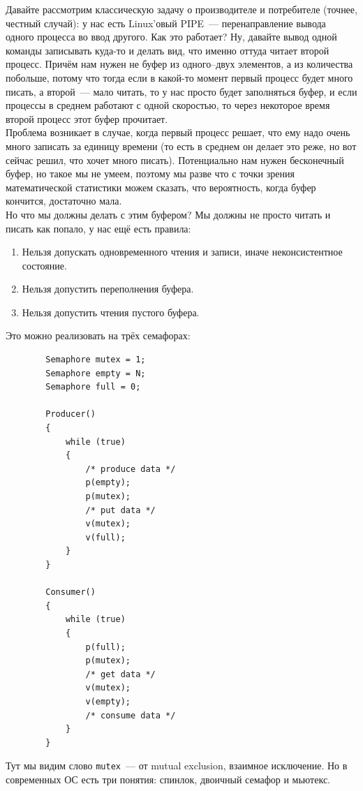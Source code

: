 \documentclass{article}
\begin{document}
    Давайте рассмотрим классическую задачу о производителе и потребителе (точнее, честный случай): у нас есть Linux'овый PIPE~--- перенаправление вывода одного процесса во ввод другого. Как это работает? Ну, давайте вывод одной команды записывать куда-то и делать вид, что именно оттуда читает второй процесс. Причём нам нужен не буфер из одного--двух элементов, а из количества побольше, потому что тогда если в какой-то момент первый процесс будет много писать, а второй~--- мало читать, то у нас просто будет заполняться буфер, и если процессы в среднем работают с одной скоростью, то через некоторое время второй процесс этот буфер прочитает.\\
    Проблема возникает в случае, когда первый процесс решает, что ему надо очень много записать за единицу времени (то есть в среднем он делает это реже, но вот сейчас решил, что хочет много писать). Потенциально нам нужен бесконечный буфер, но такое мы не умеем, поэтому мы разве что с точки зрения математической статистики можем сказать, что вероятность, когда буфер кончится, достаточно мала.\\
    Но что мы должны делать с этим буфером? Мы должны не просто читать и писать как попало, у нас ещё есть правила:
    \begin{enumerate}
        \item Нельзя допускать одновременного чтения и записи, иначе неконсистентное состояние.
        \item Нельзя допустить переполнения буфера.
        \item Нельзя допустить чтения пустого буфера.
    \end{enumerate}
    Это можно реализовать на трёх семафорах:
    \begin{verbatim}
        Semaphore mutex = 1;
        Semaphore empty = N;
        Semaphore full = 0;
        
        Producer()
        {
            while (true)
            {
                /* produce data */
                p(empty);
                p(mutex);
                /* put data */
                v(mutex);
                v(full);
            }
        }

        Consumer()
        {
            while (true)
            {
                p(full);
                p(mutex);
                /* get data */
                v(mutex);
                v(empty);
                /* consume data */
            }
        }
    \end{verbatim}
    Тут мы видим слово \Verb|mutex|~--- от mutual exclusion, взаимное исключение. Но в современных ОС есть три понятия: спинлок, двоичный семафор и мьютекс.
\end{document}
